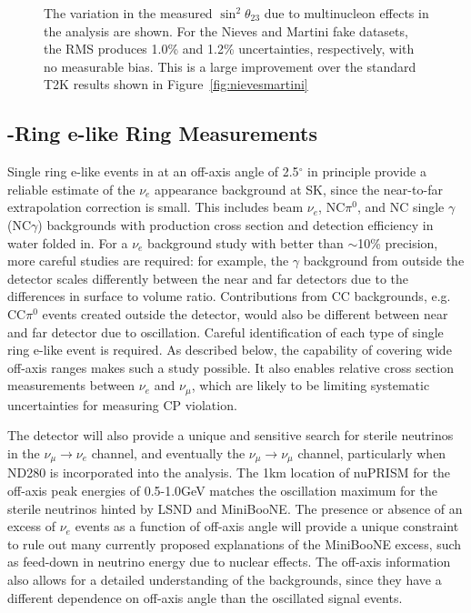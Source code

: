 \begin{figure}[htpb]
\begin{center}
\begin{minipage}[t]{.45\textwidth}
\begin{center}
    \end{center}
  \end{minipage}
\end{center}
\caption{The variation in the measured $\sin^2\theta_{23}$ due to multinucleon effects in the \nuprismlite \numu analysis are shown. For the Nieves and Martini fake datasets, the RMS produces 1.0\% and 1.2\% uncertainties, respectively, with no measurable bias. This is a large improvement over the standard T2K results shown in Figure~\ref{fig:nievesmartini}}
\label{fig:numuresults}
\end{figure}

\clearpage

\subsection{-Ring e-like Ring Measurements}

Single ring e-like events in \nuprismlite at an off-axis angle of 2.5$^\circ$ in principle provide a reliable estimate of the $\nu_e$ appearance background at SK, since the near-to-far extrapolation correction is small. This includes beam $\nu_e$, NC$\pi^0$, and NC single $\gamma$ (NC$\gamma$) backgrounds with production cross section and detection efficiency in water folded in. For a $\nu_e$ background study with better than $\sim$10\% precision, more careful studies are required: for example, the $\gamma$ background from outside the detector scales differently between the near and far detectors due to the differences in surface to volume ratio. Contributions from CC backgrounds, e.g. CC$\pi^0$ events created outside the detector, would also be different between near and far detector due to oscillation. Careful identification of each type of single ring e-like event is required. As described below, the \nuprismlite capability of covering wide off-axis ranges makes such a study possible. It also enables relative cross section measurements between $\nu_e$ and $\nu_\mu$, which are likely to be limiting systematic uncertainties for measuring CP violation.

The \nuprismlite detector will also provide a unique and sensitive search for sterile neutrinos in the $\nu_\mu\rightarrow\nu_e$ channel, and eventually the $\nu_\mu\rightarrow\nu_\mu$ channel, particularly when ND280 is incorporated into the analysis. The 1km location of nuPRISM for the off-axis peak energies of 0.5-1.0GeV matches the oscillation maximum for the sterile neutrinos hinted by LSND and MiniBooNE. The presence or absence of an excess of $\nu_e$ events as a function of off-axis angle will provide a unique constraint to rule out many currently proposed explanations of the MiniBooNE excess, such as feed-down in neutrino energy due to nuclear effects. The off-axis information also allows for a detailed understanding of the backgrounds, since they have a different dependence on off-axis angle than the oscillated signal events.

